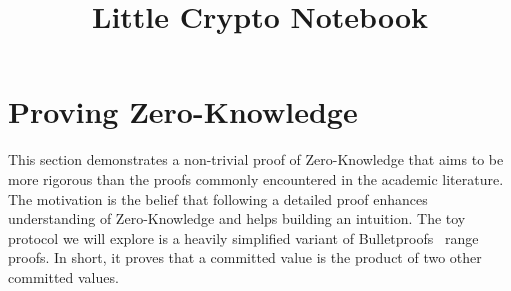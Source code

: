 \documentclass{article}
\title{Little Crypto Notebook}
\begin{document}
\maketitle
\tableofcontents

\section{Proving Zero-Knowledge}
This section demonstrates a non-trivial proof of Zero-Knowledge that aims to be more rigorous than the proofs commonly encountered in the academic literature.
The motivation is the belief that following a detailed proof enhances understanding of Zero-Knowledge and helps building an intuition.
The toy protocol we will explore is a heavily simplified variant of Bulletproofs~\cite{bp1} range proofs.
In short, it proves that a committed value is the product of two other committed values.



\printbibliography
\end{document}
